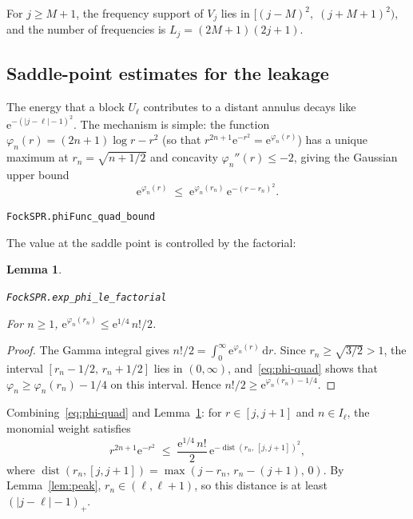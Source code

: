 \documentclass[11pt]{amsart}
\newtheorem{lemma}[theorem]{Lemma}
\theoremstyle{definition}
\theoremstyle{remark}
\begin{document}
For $j \ge M + 1$, the frequency support of $V_j$ lies in
$[(j{-}M)^2,\; (j{+}M{+}1)^2)$, and the number of frequencies is
$L_j = (2M{+}1)(2j{+}1)$.

\subsection{Saddle-point estimates for the leakage}\label{sec:saddle}

The energy that a block $U_\ell$ contributes to a distant annulus decays
like $\mathrm{e}^{-(\lvert j-\ell \rvert-1)^2}$.  The mechanism is simple: the function
$\varphi_n(r) = (2n{+}1)\log r - r^2$ (so that
$r^{2n+1}\mathrm{e}^{-r^2} = \mathrm{e}^{\varphi_n(r)}$) has a unique maximum at
$r_n = \sqrt{n+1/2}$ and concavity $\varphi_n''(r) \le -2$, giving the
Gaussian upper bound
\begin{equation}\label{eq:phi-quad}
\mathrm{e}^{\varphi_n(r)}
\;\le\;
\mathrm{e}^{\varphi_n(r_n)}\, \mathrm{e}^{-(r - r_n)^2}.
\end{equation}
\par\noindent\texttt{FockSPR.phiFunc\_quad\_bound}\par\smallskip
The value at the saddle point is controlled by the factorial:

\begin{lemma}\label{lem:exp-phi}
\par\noindent\texttt{FockSPR.exp\_phi\_le\_factorial}\par\smallskip
For $n \ge 1$,\;
$\mathrm{e}^{\varphi_n(r_n)} \le \mathrm{e}^{1/4}\, n!/2$.
\end{lemma}

\begin{proof}
The Gamma integral gives
$n!/2 = \int_0^\infty \mathrm{e}^{\varphi_n(r)}\,\mathrm{d} r$.
Since $r_n \ge \sqrt{3/2} > 1$, the interval $[r_n - 1/2,\, r_n + 1/2]$
lies in $(0,\infty)$, and~\eqref{eq:phi-quad} shows that
$\varphi_n \ge \varphi_n(r_n) - 1/4$ on this interval.  Hence
$n!/2 \ge \mathrm{e}^{\varphi_n(r_n) - 1/4}$.
\end{proof}

Combining~\eqref{eq:phi-quad} and Lemma~\ref{lem:exp-phi}: for $r \in
[j, j{+}1]$ and $n \in I_\ell$, the monomial weight satisfies
\begin{equation}\label{eq:monomial-bound}
r^{2n+1}\mathrm{e}^{-r^2}
\;\le\;
\frac{\mathrm{e}^{1/4}\, n!}{2}\,
\mathrm{e}^{-\operatorname{dist}(r_n,\,[j,j{+}1])^2},
\end{equation}
where $\operatorname{dist}(r_n, [j,j{+}1]) = \max(j - r_n,\, r_n - (j{+}1),\, 0)$.
By Lemma~\ref{lem:peak}, $r_n \in (\ell, \ell{+}1)$, so this distance is at
least $(\lvert j - \ell \rvert - 1)_+$.
\end{document}
